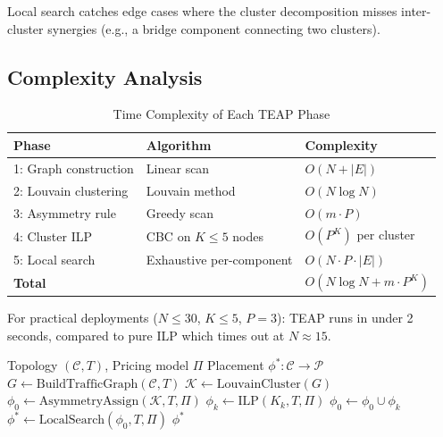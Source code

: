 \documentclass[10pt,journal,compsoc]{IEEEtran}
\begin{document}
Local search catches edge cases where the cluster decomposition misses
inter-cluster synergies (e.g., a bridge component connecting two clusters).

\subsection{Complexity Analysis}

\begin{table}[ht]
\centering
\caption{Time Complexity of Each TEAP Phase}
\begin{tabular}{lll}
\toprule
Phase & Algorithm & Complexity \\
\midrule
1: Graph construction & Linear scan & $O(N + |E|)$ \\
2: Louvain clustering & Louvain method & $O(N \log N)$ \\
3: Asymmetry rule & Greedy scan & $O(m \cdot P)$ \\
4: Cluster ILP & CBC on $K \leq 5$ nodes & $O(P^K)$ per cluster \\
5: Local search & Exhaustive per-component & $O(N \cdot P \cdot |E|)$ \\
\midrule
\textbf{Total} & & $O(N \log N + m \cdot P^K)$ \\
\bottomrule
\end{tabular}
\end{table}

For practical deployments ($N \leq 30$, $K \leq 5$, $P = 3$): TEAP runs
in under 2 seconds, compared to pure ILP which times out at $N \approx 15$.

\begin{algorithm}[ht]
\caption{TEAP: Traffic-Egress-Aware Placement}
\label{alg:teap}
\begin{algorithmic}[1]
\Require Topology $(\mathcal{C}, T)$, Pricing model $\Pi$
\Ensure Placement $\phi^*: \mathcal{C} \to \mathcal{P}$
\State $G \leftarrow \text{BuildTrafficGraph}(\mathcal{C}, T)$
\State $\mathcal{K} \leftarrow \text{LouvainCluster}(G)$ 
\State $\phi_0 \leftarrow \text{AsymmetryAssign}(\mathcal{K}, T, \Pi)$ 
  \State $\phi_k \leftarrow \text{ILP}(K_k, T, \Pi)$ 
  \State $\phi_0 \leftarrow \phi_0 \cup \phi_k$ 
\EndFor
\State $\phi^* \leftarrow \text{LocalSearch}(\phi_0, T, \Pi)$ 
\Return $\phi^*$
\end{algorithmic}
\end{algorithm}
\end{document}
